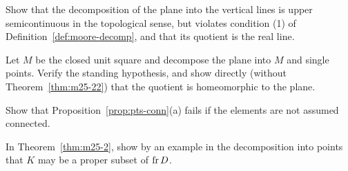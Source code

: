\begin{exercise}
Show that the decomposition of the plane into the vertical lines is upper semicontinuous in the
topological sense, but violates condition (1) of Definition~\ref{def:moore-decomp}, and that its quotient
is the real line.
\end{exercise}

\begin{exercise}
Let $M$ be the closed unit square and decompose the plane into $M$ and single points. Verify the
standing hypothesis, and show directly (without Theorem~\ref{thm:m25-22}) that the quotient is
homeomorphic to the plane.
\end{exercise}

\begin{exercise}
Show that Proposition~\ref{prop:pts-conn}(a) fails if the elements are not assumed connected.
\end{exercise}

\begin{exercise}
In Theorem~\ref{thm:m25-2}, show by an example in the decomposition into points that $K$ may be a
proper subset of $\operatorname{fr} D$.
\end{exercise}
